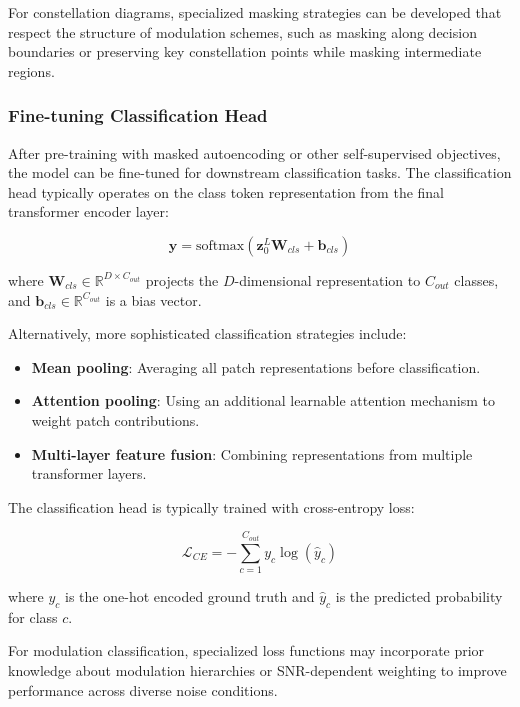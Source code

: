 For constellation diagrams, specialized masking strategies can be developed that respect the structure of modulation schemes, such as masking along decision boundaries or preserving key constellation points while masking intermediate regions.

\subsubsection{Fine-tuning Classification Head}

After pre-training with masked autoencoding or other self-supervised objectives, the model can be fine-tuned for downstream classification tasks. The classification head typically operates on the class token representation from the final transformer encoder layer:

\begin{equation}
\mathbf{y} = \text{softmax}(\mathbf{z}^L_0 \mathbf{W}_{cls} + \mathbf{b}_{cls})
\end{equation}

where $\mathbf{W}_{cls} \in \mathbb{R}^{D \times C_{out}}$ projects the $D$-dimensional representation to $C_{out}$ classes, and $\mathbf{b}_{cls} \in \mathbb{R}^{C_{out}}$ is a bias vector.

Alternatively, more sophisticated classification strategies include:

\begin{itemize}
    \item \textbf{Mean pooling}: Averaging all patch representations before classification.
    \item \textbf{Attention pooling}: Using an additional learnable attention mechanism to weight patch contributions.
    \item \textbf{Multi-layer feature fusion}: Combining representations from multiple transformer layers.
\end{itemize}

The classification head is typically trained with cross-entropy loss:

\begin{equation}
\mathcal{L}_{CE} = -\sum_{c=1}^{C_{out}} y_c \log(\hat{y}_c)
\end{equation}

where $y_c$ is the one-hot encoded ground truth and $\hat{y}_c$ is the predicted probability for class $c$.

For modulation classification, specialized loss functions may incorporate prior knowledge about modulation hierarchies or SNR-dependent weighting to improve performance across diverse noise conditions.

